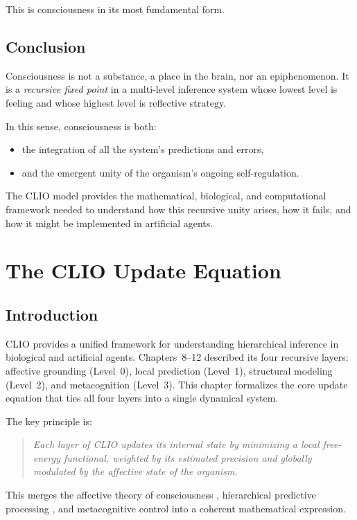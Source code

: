 \documentclass[12pt,oneside]{book}
\theoremstyle{plain}
\theoremstyle{definition}
\let\citep\parencite
\begin{document}
This is consciousness in its most fundamental form.

\section{Conclusion}

Consciousness is not a substance, a place in the brain, nor an epiphenomenon.
It is a \emph{recursive fixed point} in a multi-level inference system
whose lowest level is feeling and whose highest level is reflective strategy.

In this sense, consciousness is both:

\begin{itemize}
  \item the integration of all the system’s predictions and errors,
  \item and the emergent unity of the organism’s ongoing self-regulation.
\end{itemize}

The CLIO model provides the mathematical, biological, and computational
framework needed to understand how this recursive unity arises, how it fails,
and how it might be implemented in artificial agents.

\chapter{The CLIO Update Equation}

\section{Introduction}

CLIO provides a unified framework for understanding hierarchical inference in
biological and artificial agents. Chapters~8--12 described its four recursive
layers: affective grounding (Level~0), local prediction (Level~1), structural
modeling (Level~2), and metacognition (Level~3).
This chapter formalizes the core update equation that ties all four layers
into a single dynamical system.

The key principle is:

\begin{quote}
\emph{Each layer of CLIO updates its internal state by minimizing a local
free-energy functional, weighted by its estimated precision and globally
modulated by the affective state of the organism.}
\end{quote}

This merges the affective theory of consciousness \citep{solms2021hidden},
hierarchical predictive processing \citep{friston2010freeenergy,seth2016review},
and metacognitive control \citep{dehaene2014consciousness,lagatta2024consciousness}
into a coherent mathematical expression.
\end{document}
